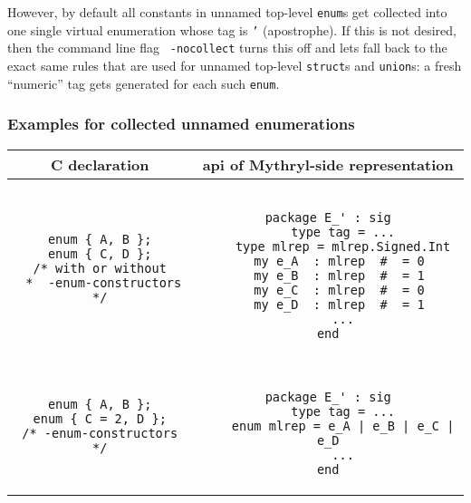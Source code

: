 However, by default all constants in unnamed top-level {\tt enum}s get
collected into one single virtual enumeration whose tag is {\tt '}
(apostrophe).  If this is not desired, then the command line flag {\tt
  -nocollect} turns this off and lets {\cgluemaker} fall back to the
exact same rules that are used for unnamed top-level {\tt struct}s and
{\tt union}s: a fresh ``numeric'' tag gets generated for each such
{\tt enum}.

\subsubsection*{Examples for collected unnamed enumerations}

\begin{small}
\begin{center}
\begin{tabular}{c|c}
C declaration & api of Mythryl-side representation \\ \hline\hline
\begin{minipage}{2in}
\begin{verbatim}
enum { A, B };
enum { C, D };
/* with or without
 *  -enum-constructors */
\end{verbatim}
\end{minipage}
&
\begin{minipage}{4in}
\begin{verbatim}

package E_' : sig
    type tag = ...
    type mlrep = mlrep.Signed.Int
    my e_A  : mlrep  #  = 0 
    my e_B  : mlrep  #  = 1 
    my e_C  : mlrep  #  = 0 
    my e_D  : mlrep  #  = 1 
    ...
end

\end{verbatim}
\end{minipage}
\\ \hline
\begin{minipage}{2in}
\begin{verbatim}
enum { A, B };
enum { C = 2, D };
/* -enum-constructors */
\end{verbatim}
\end{minipage}
&
\begin{minipage}{4in}
\begin{verbatim}

package E_' : sig
    type tag = ...
    enum mlrep = e_A | e_B | e_C | e_D
    ...
end

\end{verbatim}
\end{minipage}
\end{tabular}
\end{center}
\end{small}

%




